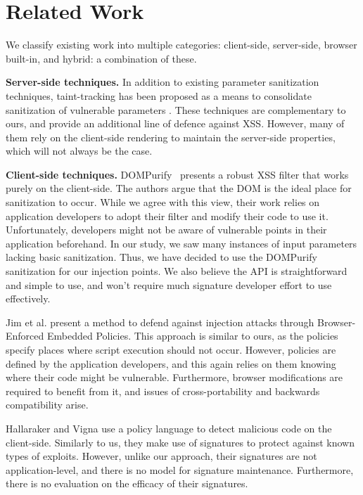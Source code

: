 \section{Related Work}
We classify existing work into multiple categories: client-side, server-side, browser built-in, and hybrid: a combination of these.

\noindent \textbf{Server-side techniques.} 
In addition to existing parameter sanitization techniques,
taint-tracking has been proposed as a means to consolidate
sanitization of vulnerable parameters
\cite{Xu:2006:TPE:1267336.1267345,DBLP:conf/sec/Nguyen-TuongGGSE05,Pietraszek:2005:DAI:2146257.2146267,Bisht:2008:XPD:1428322.1428325}. These
techniques are complementary to ours, and provide an additional line
of defence against \ac{XSS}. However, many of them rely on the
client-side rendering to maintain the server-side properties, which
will not always be the case.

\noindent \textbf{Client-side techniques.} 
DOMPurify~\cite{10.1007/978-3-319-66399-9_7} presents a robust
\ac{XSS} filter that works purely on the client-side. The authors
argue that the DOM is the ideal place for sanitization to occur. While
we agree with this view, their work relies on application developers
to adopt their filter and modify their code to use it. Unfortunately,
developers might not be aware of vulnerable points in their
application beforehand. In our study, we saw many instances of input
parameters lacking basic sanitization. Thus, we have decided to use
the DOMPurify sanitization for our injection points. We also believe
the API is straightforward and simple to use, and won't require much
signature developer effort to use effectively.

Jim et al. \cite{Jim:2007:DSI:1242572.1242654} present a method to
defend against injection attacks through Browser-Enforced Embedded
Policies. This approach is similar to ours, as the policies specify
places where script execution should not occur. However, policies are
defined by the application developers, and this again relies on them
knowing where their code might be vulnerable. Furthermore, browser
modifications are required to benefit from it, and issues of
cross-portability and backwards compatibility arise.

Hallaraker and Vigna \cite{Hallaraker:2005:DMJ:1078029.1078861} use a
policy language to detect malicious code on the client-side. Similarly
to us, they make use of signatures to protect against known types of
exploits. However, unlike our approach, their signatures are not
application-level, and there is no model for signature
maintenance. Furthermore, there is no evaluation on the efficacy of
their signatures.

